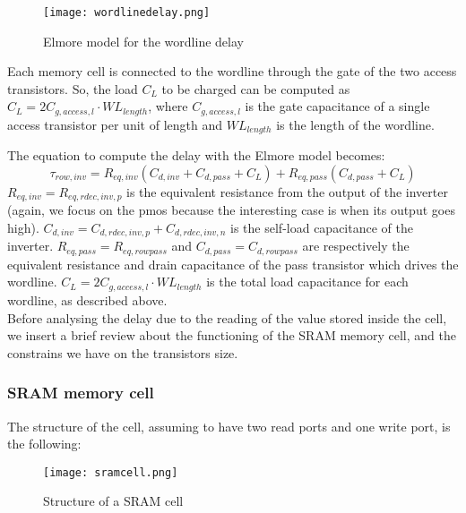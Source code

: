 \begin{center}
	\begin{figure}[H]
		\centering
		\texttt{[image: wordlinedelay.png]}
		\caption{Elmore model for the wordline delay}
	\end{figure}
\end{center}

Each memory cell is connected to the wordline through the gate of the two access transistors. So, the load $C_L$ to be charged can be computed as $C_L=2C_{g,access,l}\cdot WL_{length}$, where $C_{g,access,l}$ is the gate capacitance of a single access transistor per unit of length and $WL_{length}$ is the length of the wordline.

The equation to compute the delay with the Elmore model becomes:
$$\tau_{row,inv}=R_{eq,inv}(C_{d,inv}+C_{d,pass}+C_L)+R_{eq,pass}(C_{d,pass}+C_L)$$
$R_{eq,inv}=R_{eq,rdec,inv,p}$ is the equivalent resistance from the output of the inverter (again, we focus on the pmos because the interesting case is when its output goes high). $C_{d,inv}=C_{d,rdec,inv,p}+C_{d,rdec,inv,n}$ is the self-load capacitance of the inverter. $R_{eq,pass}=R_{eq,rowpass}$ and $C_{d,pass}=C_{d,rowpass}$ are respectively the equivalent resistance and drain capacitance of the pass transistor which drives the wordline. $C_L=2C_{g,access,l}\cdot WL_{length}$ is the total load capacitance for each wordline, as described above. \\

Before analysing the delay due to the reading of the value stored inside the cell, we insert a brief review about the functioning of the SRAM memory cell, and the constrains we have on the transistors size. 

\subsubsection{SRAM memory cell}
\label{subsec:SRAM_memory_cell}
The structure of the cell, assuming to have two read ports and one write port, is the following:

\begin{center}
	\begin{figure}[H]
		\centering
		\texttt{[image: sramcell.png]}
		\caption{Structure of a SRAM cell}
	\end{figure}
\end{center}

